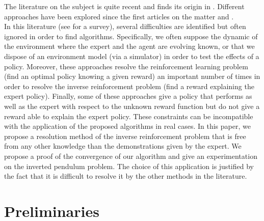 \documentclass{article}
\begin{document}
The literature on the subject is quite recent and finds its origin in \cite{russell1998learning}. Different approaches have been explored since the first articles on the matter \cite{ng2000algorithms} and \cite{abbeel2004apprenticeship}.\\
In this literature (see \cite{neu2009training} for a survey), several difficulties are identified but often ignored in order to find algorithms. Specifically, we often suppose the dynamic of the environment where the expert and the agent are evolving known, or that we dispose of an environment model (via a simulator) in order to test the effects of a policy. Moreover, these approaches resolve the reinforcement learning problem (find an optimal policy knowing a given reward) an important number of times in order to resolve the inverse reinforcement problem (find a reward explaining the expert policy). Finally, some of these approaches give a policy that performs as well as the expert with respect to the unknown reward function but do not give a reward able to explain the expert policy. These constraints can be incompatible with the application of the proposed algorithms in real cases.
In this paper, we propose a resolution method of the inverse reinforcement problem that is free from any other knowledge than the demonstrations given by the expert. We propose a proof of the convergence of our algorithm and give an experimentation on the inverted pendulum problem. The choice of this application is justified by the fact that it is difficult to resolve it by the other methods in the literature.
\section{Preliminaries}
\label{back.sec}
\end{document}
